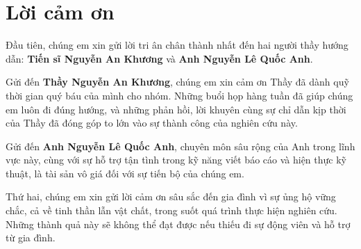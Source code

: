 \chapter*{Lời cảm ơn}
Đầu tiên, chúng em xin gửi lời tri ân chân thành nhất đến hai người thầy hướng dẫn: \textbf{Tiến sĩ Nguyễn An Khương} và \textbf{Anh Nguyễn Lê Quốc Anh}.

Gửi đến \textbf{Thầy Nguyễn An Khương}, chúng em xin cảm ơn Thầy đã dành quỹ thời gian quý báu của mình cho nhóm. Những buổi họp hàng tuần đã giúp chúng em luôn đi đúng hướng, và những phản hồi, lời khuyên cùng sự chỉ dẫn kịp thời của Thầy đã đóng góp to lớn vào sự thành công của nghiên cứu này.

Gửi đến \textbf{Anh Nguyễn Lê Quốc Anh}, chuyên môn sâu rộng của Anh trong lĩnh vực này, cùng với sự hỗ trợ tận tình trong kỹ năng viết báo cáo và hiện thực kỹ thuật, là tài sản vô giá đối với sự tiến bộ của chúng em.

Thứ hai, chúng em xin gửi lời cảm ơn sâu sắc đến gia đình vì sự ủng hộ vững chắc, cả về tinh thần lẫn vật chất, trong suốt quá trình thực hiện nghiên cứu. Những thành quả này sẽ không thể đạt được nếu thiếu đi sự động viên và hỗ trợ từ gia đình.

